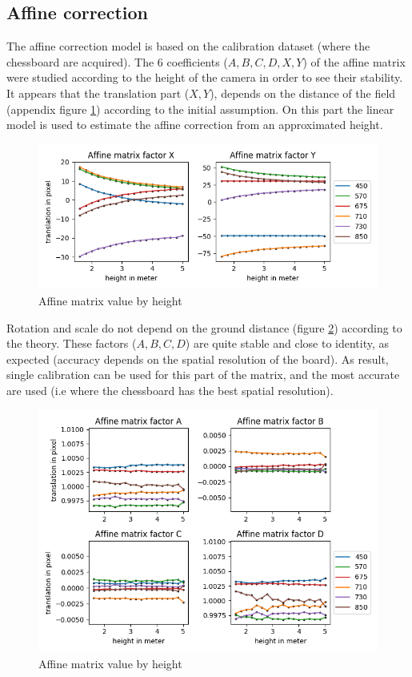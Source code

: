 \documentclass[]{elsarticle}
\begin{document}
	\subsection{Affine correction}
	
	The affine correction model is based on the calibration dataset (where the chessboard are acquired).
	The 6 coefficients ($A,B,C,D,X,Y$) of the affine matrix were studied according to the height of the camera in order to see their stability.
	It appears that the translation part ($X,Y$), depends on the distance of the field
	(appendix figure \ref{fig:affine-translation-height}) according to the initial assumption.
	On this part the linear model is used to estimate the affine correction from an approximated height.
	
	\begin{figure}[H]
		\centering
		\includegraphics[width=0.5\linewidth]{../figures/affine-translation-height.png}
		\caption{Affine matrix value by height}
		\label{fig:affine-translation-height}
	\end{figure}

	Rotation and scale do not depend on the ground distance (figure \ref{fig:affine-rotation-height}) according to the theory.
	These factors ($A,B,C,D$) are quite stable and close to identity, as expected (accuracy depends on the spatial resolution of the board).
	As result, single calibration can be used for this part of the matrix, and the most accurate are used (i.e where the chessboard has the best spatial resolution).
	
	\begin{figure}[H]
		\centering
		\includegraphics[width=0.5\linewidth]{../figures/affine-rotation-height.png}
		\caption{Affine matrix value by height}
		\label{fig:affine-rotation-height}
	\end{figure}
	
\end{document}
